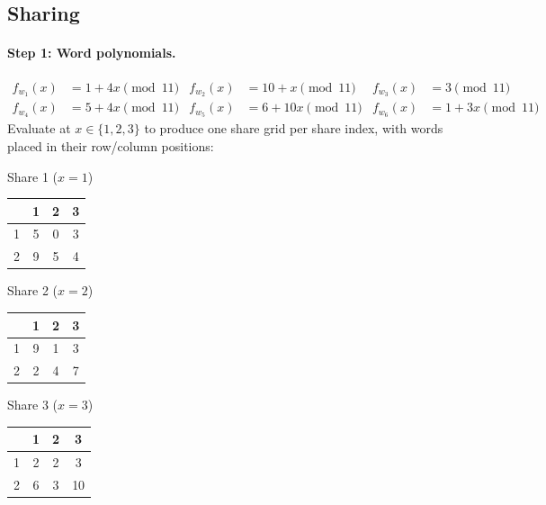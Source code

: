 \documentclass[11pt]{article}
\begin{document}
\subsection{Sharing}

\paragraph{Step 1: Word polynomials.}
\begin{align*}
f_{w_1}(x) &= 1 + 4x \pmod{11} &
f_{w_2}(x) &= 10 + x \pmod{11} &
f_{w_3}(x) &= 3 \pmod{11} \\
f_{w_4}(x) &= 5 + 4x \pmod{11} &
f_{w_5}(x) &= 6 + 10x \pmod{11} &
f_{w_6}(x) &= 1 + 3x \pmod{11}
\end{align*}
Evaluate at $x \in \{1,2,3\}$ to produce one share grid per share index, with words placed in their row/column positions:

\begin{center}
\small
\begin{minipage}[t]{0.3\linewidth}
\centering
Share 1 ($x=1$)\\[4pt]
\begin{tabular}{@{}c|ccc@{}}
\toprule
 & 1 & 2 & 3 \\ \midrule
1 & 5 & 0 & 3 \\
2 & 9 & 5 & 4 \\
\bottomrule
\end{tabular}
\end{minipage}%
\hfill
\begin{minipage}[t]{0.3\linewidth}
\centering
Share 2 ($x=2$)\\[4pt]
\begin{tabular}{@{}c|ccc@{}}
\toprule
 & 1 & 2 & 3 \\ \midrule
1 & 9 & 1 & 3 \\
2 & 2 & 4 & 7 \\
\bottomrule
\end{tabular}
\end{minipage}%
\hfill
\begin{minipage}[t]{0.3\linewidth}
\centering
Share 3 ($x=3$)\\[4pt]
\begin{tabular}{@{}c|ccc@{}}
\toprule
 & 1 & 2 & 3 \\ \midrule
1 & 2 & 2 & 3 \\
2 & 6 & 3 & 10 \\
\bottomrule
\end{tabular}
\end{minipage}
\end{center}
\end{document}
